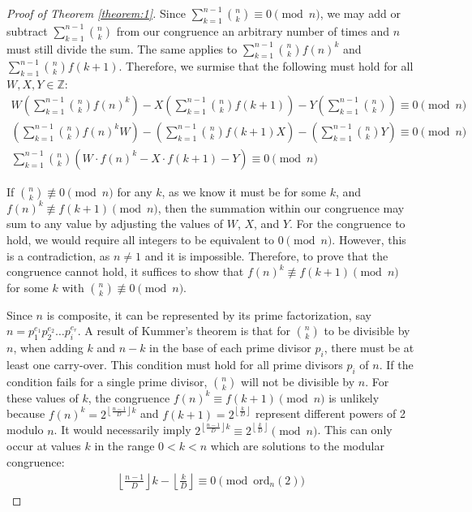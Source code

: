 \documentclass{article}
\theoremstyle{plain}
\theoremstyle{definition}
\begin{document}
\begin{proof}[Proof of Theorem \ref{theorem:1}]
Since $\sum_{k=1}^{n-1} \binom{n}{k} \equiv 0 \pmod{n}$, we may add or subtract $\sum_{k=1}^{n-1} \binom{n}{k}$ from our congruence an arbitrary number of times and $n$ must still divide the sum. The same applies to $\sum_{k=1}^{n-1} \binom{n}{k} f(n)^k$ and $\sum_{k=1}^{n-1} \binom{n}{k} f(k+1)$. Therefore, we surmise that the following must hold for all $W,X,Y \in \mathbb{Z}$:
\begin{align}
W \left(\sum_{k=1}^{n-1} \binom{n}{k} f(n)^k\right) - X \left(\sum_{k=1}^{n-1} \binom{n}{k} f(k+1)\right) - Y \left(\sum_{k=1}^{n-1} \binom{n}{k}\right) \equiv 0 \pmod{n} \\
\left(\sum_{k=1}^{n-1} \binom{n}{k} f(n)^k W\right) - \left(\sum_{k=1}^{n-1} \binom{n}{k} f(k+1) X\right) - \left(\sum_{k=1}^{n-1} \binom{n}{k} Y\right) \equiv 0 \pmod{n} \\
\sum_{k=1}^{n-1} \binom{n}{k} \left( W \cdot f(n)^k - X \cdot f(k+1) - Y\right) \equiv 0 \pmod{n}
\end{align}

If $\binom{n}{k} \not\equiv 0 \pmod{n}$ for any $k$, as we know it must be for some $k$, and $f(n)^k \not\equiv f(k+1) \pmod{n}$, then the summation within our congruence may sum to any value by adjusting the values of $W$, $X$, and $Y$. For the congruence to hold, we would require all integers to be equivalent to $0 \pmod{n}$. However, this is a contradiction, as $n\not=1$ and it is impossible. Therefore, to prove that the congruence cannot hold, it suffices to show that $f(n)^k \not\equiv f(k+1) \pmod{n}$ for some $k$ with $\binom{n}{k} \not\equiv 0 \pmod{n}$.

Since \( n \) is composite, it can be represented by its prime factorization, say \( n = p_1^{e_1} p_2^{e_2} \ldots p_i^{e_r} \). A result of Kummer's theorem \cite{kummer1857} is that for \( \binom{n}{k} \) to be divisible by \( n \), when adding \( k \) and \( n-k \) in the base of each prime divisor \( p_i \), there must be at least one carry-over. This condition must hold for all prime divisors \( p_i \) of \( n \). If the condition fails for a single prime divisor, \( \binom{n}{k} \) will not be divisible by \( n \). For these values of \( k \), the congruence \( f(n)^k \equiv f(k+1) \pmod{n} \) is unlikely because \( f(n)^k = 2^{\left\lfloor \frac{n-1}{D} \right\rfloor k} \) and \( f(k+1) = 2^{\left\lfloor \frac{k}{D} \right\rfloor}\) represent different powers of 2 modulo \( n \). It would necessarily imply $2^{\left\lfloor \frac{n-1}{D} \right\rfloor k} \equiv 2^{\left\lfloor \frac{k}{D} \right\rfloor} \pmod{n}$. This can only occur at values $k$ in the range $0 < k < n$ which are solutions to the modular congruence:
\begin{align}
    \left\lfloor \frac{n-1}{D} \right\rfloor k - \left\lfloor \frac{k}{D} \right\rfloor \equiv 0 \pmod{\text{ord}_n(2)}
\end{align}


\end{proof}
\end{document}
